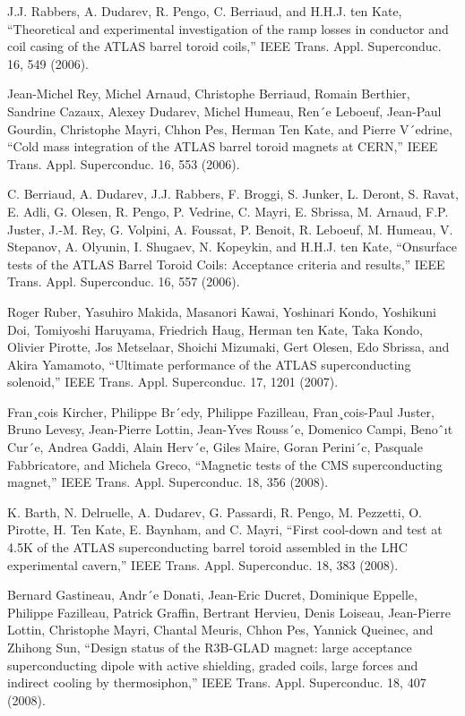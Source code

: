 \noindent [9.295] J.J. Rabbers, A. Dudarev, R. Pengo, C. Berriaud, and H.H.J. ten Kate, ``Theoretical
and experimental investigation of the ramp losses in conductor and coil
casing of the ATLAS barrel toroid coils,” IEEE Trans. Appl. Superconduc. 16,
549 (2006).

\noindent [9.296] Jean-Michel Rey, Michel Arnaud, Christophe Berriaud, Romain Berthier, Sandrine
Cazaux, Alexey Dudarev, Michel Humeau, Ren´e Leboeuf, Jean-Paul Gourdin,
Christophe Mayri, Chhon Pes, Herman Ten Kate, and Pierre V´edrine, ``Cold
mass integration of the ATLAS barrel toroid magnets at CERN,” IEEE Trans.
Appl. Superconduc. 16, 553 (2006).

\noindent [9.297] C. Berriaud, A. Dudarev, J.J. Rabbers, F. Broggi, S. Junker, L. Deront, S. Ravat,
E. Adli, G. Olesen, R. Pengo, P. Vedrine, C. Mayri, E. Sbrissa, M. Arnaud,
F.P. Juster, J.-M. Rey, G. Volpini, A. Foussat, P. Benoit, R. Leboeuf, M. Humeau,
V. Stepanov, A. Olyunin, I. Shugaev, N. Kopeykin, and H.H.J. ten Kate, ``Onsurface
tests of the ATLAS Barrel Toroid Coils: Acceptance criteria and results,”
IEEE Trans. Appl. Superconduc. 16, 557 (2006).

\noindent [9.298] Roger Ruber, Yasuhiro Makida, Masanori Kawai, Yoshinari Kondo, Yoshikuni
Doi, Tomiyoshi Haruyama, Friedrich Haug, Herman ten Kate, Taka Kondo, Olivier
Pirotte, Jos Metselaar, Shoichi Mizumaki, Gert Olesen, Edo Sbrissa, and Akira
Yamamoto, ``Ultimate performance of the ATLAS superconducting solenoid,”
IEEE Trans. Appl. Superconduc. 17, 1201 (2007).

\noindent [9.299] Fran¸cois Kircher, Philippe Br´edy, Philippe Fazilleau, Fran¸cois-Paul Juster, Bruno
Levesy, Jean-Pierre Lottin, Jean-Yves Rouss´e, Domenico Campi, Benoˆıt Cur´e,
Andrea Gaddi, Alain Herv´e, Giles Maire, Goran Perini´c, Pasquale Fabbricatore,
and Michela Greco, ``Magnetic tests of the CMS superconducting magnet,” IEEE
Trans. Appl. Superconduc. 18, 356 (2008).

\noindent [9.300] K. Barth, N. Delruelle, A. Dudarev, G. Passardi, R. Pengo, M. Pezzetti, O. Pirotte,
H. Ten Kate, E. Baynham, and C. Mayri, ``First cool-down and test at 4.5K
of the ATLAS superconducting barrel toroid assembled in the LHC experimental
cavern,” IEEE Trans. Appl. Superconduc. 18, 383 (2008).

\noindent [9.301] Bernard Gastineau, Andr´e Donati, Jean-Eric Ducret, Dominique Eppelle, Philippe
Fazilleau, Patrick Graffin, Bertrant Hervieu, Denis Loiseau, Jean-Pierre Lottin,
Christophe Mayri, Chantal Meuris, Chhon Pes, Yannick Queinec, and Zhihong
Sun, ``Design status of the R3B-GLAD magnet: large acceptance superconducting
dipole with active shielding, graded coils, large forces and indirect cooling
by thermosiphon,” IEEE Trans. Appl. Superconduc. 18, 407 (2008).

